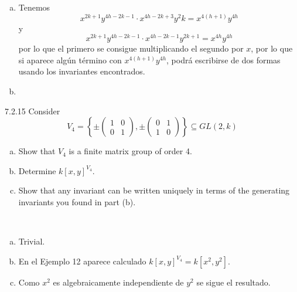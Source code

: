 \documentclass[twoside]{article}
\begin{document}
\begin{solucion}
\begin{enumerate}[a.]
\item Tenemos
\[
x^{2k+1}y^{4h-2k-1}\cdot x^{4h-2k+3}y^2k=x^{4(h+1)}y^{4h}
\]
y
\[
x^{2k+1}y^{4h-2k-1}\cdot x^{4h-2k-1}y^{2k+1}=x^{4h}y^{4h}
\]
por lo que el primero se consigue multiplicando el segundo por $x$, por lo que si aparece algún término con $x^{4(h+1)}y^{4h}$, podrá escribirse de dos formas usando los invariantes encontrados.
\item
\end{enumerate}
\end{solucion}

\newpage
\begin{ejercicio}{7.2.15}
Consider
\[
V_4 =\left\{\pm\begin{pmatrix}
1 & 0\\
0 & 1
\end{pmatrix},\pm\begin{pmatrix}
0 & 1\\
1 & 0
\end{pmatrix}\right\}\subseteq GL(2, k)
\]
\begin{enumerate}[a.]
\item Show that $V_4$ is a finite matrix group of order 4.
\item Determine $k[x, y]^{V_4}$.
\item Show that any invariant can be written uniquely in terms of the generating invariants
you found in part (b).
\end{enumerate}
\end{ejercicio}
\begin{solucion}\
\begin{enumerate}[a.]
\item Trivial.
\item En el Ejemplo 12 aparece calculado $k[x, y]^{V_4}=k[x^2,y^2]$. 
\item Como $x^2$ es algebraicamente independiente de $y^2$ se sigue el resultado.
\end{enumerate}
\end{solucion}
\end{document}
